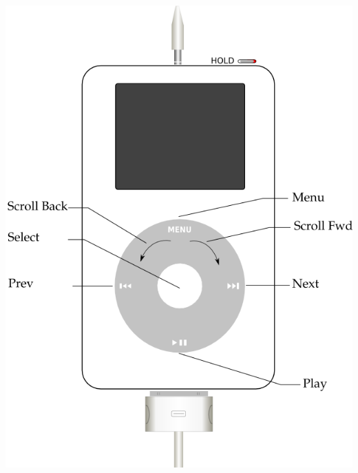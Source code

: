 \begin{center}
{    {\includegraphics{rockbox_interface/images/ipodcolor-front.png}}
 }
\end{center}
